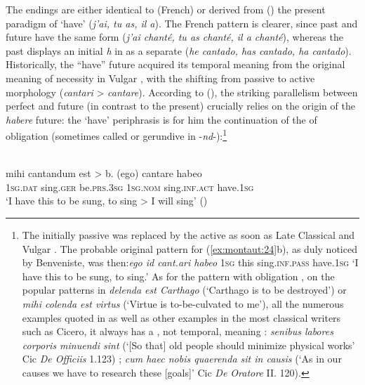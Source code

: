 \documentclass[output=paper]{langsci/langscibook}
\begin{document}
The endings are either identical to (French) or derived from () the present paradigm of ‘have’ (\textit{j’ai, tu as, il a}). The French pattern is clearer, since past and future  have the same form (\textit{j’ai chanté, tu as chanté, il a chanté}), whereas the past  displays an initial \textit{h} in  as a separate  (\textit{he cantado, has cantado, ha cantado}).
  Historically, the “have”  future acquired its temporal meaning from the original meaning of necessity in Vulgar , with the  shifting from passive to active morphology (\textit{cantari} > \textit{cantare}). According to \citeauthor{Kuryłowicz1965} (\citeyear[107]{Kuryłowicz1931}),
  the striking parallelism between perfect and future (in contrast to the present) crucially relies on the origin of the \textit{habere}  future: the ‘have’ periphrasis is for him the continuation of the   of obligation (sometimes called  or gerundive in -\textit{nd}{}-):\footnote{The initially passive  was replaced by the active  as soon as Late Classical and Vulgar . The probable original pattern for (\ref{ex:montaut:24}b), as duly noticed by Benveniste, was then:\textit{ego id cant.ari   habeo} \textsc{1sg} this sing.\textsc{inf.pass} have.\textsc{1sg}  ‘I have this to be sung, to sing.’ As for the  pattern with obligation , on the popular patterns in \textit{delenda est Carthago} (‘Carthago is to be destroyed’) or \textit{mihi colenda est virtus} (‘Virtue is to-be-culvated to me’), all the numerous examples quoted in \citet[164 ff]{Touratier1994} as well as other  examples in the most classical writers such as Cicero, it always has a , not temporal, meaning : \textit{senibus labores corporis minuendi sint} (‘[So that] old people should minimize physical works’ Cic \textit{De Officiis} 1.123) ; \textit{cum haec nobis quaerenda sit in causis} (‘As in our causes we have to research these [goals]’ Cic \textit{De Oratore} II. 120).}

\ea\label{ex:montaut:24}
\\
 mihi  cantandum  est    {> \upshape b.} (ego)     cantare  habeo \\
{} \textsc{1sg.dat}   sing.\textsc{ger} {} {}  be.\textsc{prs.3sg}      \textsc{1sg.nom} sing.\textsc{inf.act} have.\textsc{1sg} \\
\glt ‘I have this to be sung, to sing  > I will sing’    (\citealt[107]{Kuryłowicz1931})
\z 
\end{document}

